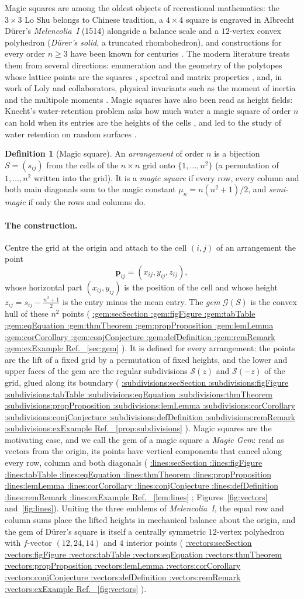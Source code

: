 \documentclass[11pt,a4paper]{article}
\makeatletter
\def\Cref@getprefix#1:#2\relax{#1}
\def\Cref@prefix@sec{sec}
\def\Cref@prefix@fig{fig}
\def\Cref@prefix@tab{tab}
\def\Cref@prefix@eq{eq}
\def\Cref@prefix@thm{thm}
\def\Cref@prefix@prop{prop}
\def\Cref@prefix@lem{lem}
\def\Cref@prefix@cor{cor}
\def\Cref@prefix@conj{conj}
\def\Cref@prefix@def{def}
\def\Cref@prefix@rem{rem}
\def\Cref@prefix@ex{ex}
\def\Cref@type@cap#1{%
  \edef\Cref@tmp{#1}%
  \ifx\Cref@tmp\Cref@prefix@sec Section%
  \else\ifx\Cref@tmp\Cref@prefix@fig Figure%
  \else\ifx\Cref@tmp\Cref@prefix@tab Table%
  \else\ifx\Cref@tmp\Cref@prefix@eq Equation%
  \else\ifx\Cref@tmp\Cref@prefix@thm Theorem%
  \else\ifx\Cref@tmp\Cref@prefix@prop Proposition%
  \else\ifx\Cref@tmp\Cref@prefix@lem Lemma%
  \else\ifx\Cref@tmp\Cref@prefix@cor Corollary%
  \else\ifx\Cref@tmp\Cref@prefix@conj Conjecture%
  \else\ifx\Cref@tmp\Cref@prefix@def Definition%
  \else\ifx\Cref@tmp\Cref@prefix@rem Remark%
  \else\ifx\Cref@tmp\Cref@prefix@ex Example%
  \else Ref.%
  \fi\fi\fi\fi\fi\fi\fi\fi\fi\fi\fi\fi
}
\DeclareRobustCommand{\Cref}[1]{%
  \begingroup
  \edef\Cref@label{#1}%
  \edef\Cref@prefix{\expandafter\Cref@getprefix\Cref@label:\relax}%
  \hyperref[#1]{\Cref@type@cap{\Cref@prefix}~\ref*{#1}}%
  \endgroup
}
\theoremstyle{plain}
\theoremstyle{definition}
\newtheorem{definition}[theorem]{Definition}
\theoremstyle{remark}
\makeatother
\begin{document}
Magic squares are among the oldest objects of recreational mathematics: the $3\times3$ Lo Shu belongs to Chinese tradition, a $4\times4$ square is engraved in Albrecht D\"urer's \emph{Melencolia~I} (1514) alongside a balance scale and a $12$-vertex convex polyhedron (\emph{D\"urer's solid}, a truncated rhombohedron), and constructions for every order $n\ge3$ have been known for centuries \cite{andrews1960magic,pickover2002zen}.
The modern literature treats them from several directions: enumeration and the geometry of the polytopes whose lattice points are the squares \cite{stanley1973magic,ehrhart1973magic,ahmed2003polyhedral,beck2006insideout,beck2010enumeration}, spectral and matrix properties \cite{loly2009spectra,nordgren2012properties,nordgren2014spectra,cameron2013signatura}, and, in work of Loly and collaborators, physical invariants such as the moment of inertia and the multipole moments \cite{loly2004invariance,rogers2004inertia,rogers2005multipole}.
Magic squares have also been read as height fields: Knecht's water-retention problem asks how much water a magic square of order $n$ can hold when its entries are the heights of the cells \cite{oeis_A201126}, and led to the study of water retention on random surfaces \cite{knecht2012retention}.

\begin{definition}[Magic square]
\label{def:magic_square}
An \emph{arrangement} of order $n$ is a bijection $S=(s_{ij})$ from the cells of the $n\times n$ grid onto $\{1,\dots,n^2\}$ (a permutation of $1,\dots,n^2$ written into the grid).
It is a \emph{magic square} if every row, every column and both main diagonals sum to the magic constant $\mu_n=n(n^2+1)/2$, and \emph{semi-magic} if only the rows and columns do.
\end{definition}

\paragraph{The construction.}
Centre the grid at the origin and attach to the cell $(i,j)$ of an arrangement the point
\[
\mathbf p_{ij}=(x_{ij},y_{ij},z_{ij}),
\]
whose horizontal part $(x_{ij},y_{ij})$ is the position of the cell and whose height $z_{ij}=s_{ij}-\frac{n^2+1}{2}$ is the entry minus the mean entry.
The \emph{gem} $\mathcal G(S)$ is the convex hull of these $n^2$ points (\Cref{sec:gem}).
It is defined for every arrangement: the points are the lift of a fixed grid by a permutation of fixed heights, and the lower and upper faces of the gem are the regular subdivisions $\mathcal S(z)$ and $\mathcal S(-z)$ of the grid, glued along its boundary (\Cref{prop:subdivisions}).
Magic squares are the motivating case, and we call the gem of a magic square a \emph{Magic Gem}: read as vectors from the origin, its points have vertical components that cancel along every row, column and both diagonals (\Cref{lem:lines}; Figures~\ref{fig:vectors} and~\ref{fig:lines}).
Uniting the three emblems of \emph{Melencolia~I}, the equal row and column sums place the lifted heights in mechanical balance about the origin, and the gem of D\"urer's square is itself a centrally symmetric $12$-vertex polyhedron with $f$-vector $(12,24,14)$ and $4$ interior points (\Cref{fig:vectors}).
\end{document}

